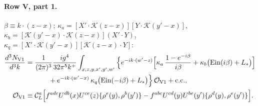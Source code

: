 \documentclass[10pt]{article}
\numberwithin{equation}{section}
\newcommand{\Ls}{L_{*}}
\newcommand{\CL}{\mathcal C_L}
\newcommand{\OO}{\mathcal O}
\newcommand{\KK}{\mathcal K}
\newcommand{\pre}{\frac{1}{(2\pi)^3}}
\newcommand{\Ein}{\mathrm{Ein}}
\begin{document}
\paragraph{Row V, part 1.} $\beta\equiv k\cdot(z-x)$; $\kappa_a=[X'\!\cdot\KK(z-x)][Y\!\cdot\KK(y'-x)]$, $\kappa_b=[\KK(y'-x)\cdot\KK(z-x)](X'\!\cdot Y)$, $\kappa_q=[X'\!\cdot\KK(y'-x)][\KK(z-x)\cdot Y]$:
\begin{equation}
\begin{aligned}\frac{d^3N_{\rm V1}}{d^3k}={}&\pre\frac{ig^4}{32\pi^5k^+}\int_{x,z,y,x',y',w'}\Big\{e^{-ik\cdot(w'-z)}\Big[\kappa_a\,\frac{1-e^{-i\beta}}{i\beta}+\kappa_b\big(\Ein(i\beta)+\Ls\big)\Big]\\&\qquad+e^{-ik\cdot(w'-x)}\,\kappa_q\big(\Ein(-i\beta)+\Ls\big)\Big\}\,\OO_{\rm V1}+{\rm c.c.},\\
\OO_{\rm V1}\equiv{}&\CL^a\Big[f^{adc}U^{db}(x)U^{ce}(z)\{\rho^e(y),\rho^b(y')\}-f^{abc}U^{cd}(y)U^{be}(y')\{\rho^d(y),\rho^e(y')\}\Big].\end{aligned}
\label{eq:V1}
\end{equation}
\end{document}
